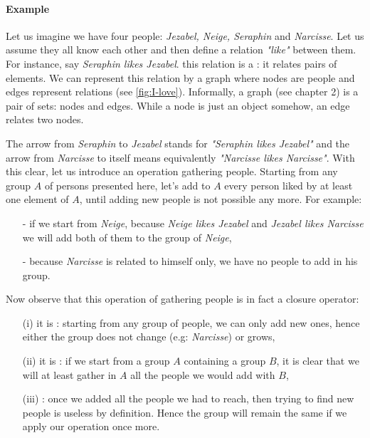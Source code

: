 \paragraph{Example} Let us imagine we have four people: \textit{Jezabel, Neige, 
Seraphin} and \textit{Narcisse}. Let us assume they all know each other and then
define a relation \textit{"like"} between them. For instance, say 
\textit{Seraphin likes Jezabel}. this relation is a : 
it relates pairs of elements. We can represent this relation by a graph where 
nodes are people and edges represent relations (see \ref{fig:I-love}). Informally, a graph (see chapter 2) is a pair of sets: nodes and edges. While a
node is just an object somehow, an edge relates two nodes.

\begin{figure}[ht]
	
\end{figure}

The arrow from \textit{Seraphin} to \textit{Jezabel} stands for 
\textit{"Seraphin likes Jezabel"} and the arrow from \textit{Narcisse} to itself
means equivalently \textit{"Narcisse likes Narcisse"}. With this clear, let 
us introduce an operation gathering people. Starting from any group $A$ of 
persons presented here, let's add to $A$ every person liked by at least one 
element of $A$, until adding new people is not possible any more. For example:
\begin{itemize}
	\item[-] if we start from \textit{Neige}, because \textit{Neige likes
	Jezabel} and \textit{Jezabel likes Narcisse} we will add
	both of them to the group of \textit{Neige},
	\item[-] because \textit{Narcisse} is related to himself only, we have no people to add in his group.
\end{itemize}
\noindent Now observe that this operation of gathering people is in fact a
closure operator:
\begin{itemize}
	\item[(i)] it is : starting from any group of people,
	we can only add new ones, hence either the group does not change (e.g: 
	\textit{Narcisse}) or grows,
	\item[(ii)] it is : if we start from a group $A$ containing
	a group $B$, it is clear that we will at least gather in $A$ all the people
	we would add with $B$,
	\item[(iii)] : once we added all the people we had to
	reach, then trying to find new people is useless by definition. Hence the
	group will remain the same if we apply our operation once more.
\end{itemize}

